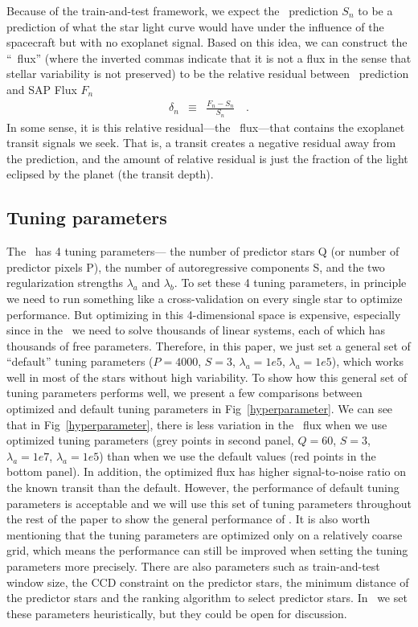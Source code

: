 Because of the train-and-test framework,  we expect the \name\ prediction $S_{n}$ to be a prediction of what the star light curve would have under the influence of the spacecraft but with no exoplanet signal. 
Based on this idea, 
  we can construct the ``\name\ flux'' 
  (where the inverted commas indicate that it is not a flux in the sense that stellar variability is not preserved) 
  to be the relative residual between \name\ prediction and SAP Flux $F_{n}$
\begin{eqnarray}
\delta_{n}&\equiv&\frac{F_{n} - S_{n}}{S_{n}}
\quad .
\end{eqnarray} 
In some sense, it is this relative residual---the \name\ flux---that contains the exoplanet transit signals we seek. 
That is, a transit creates a negative residual away from the prediction, 
  and the amount of relative residual is just the fraction of the light eclipsed by the planet (the transit depth). 

\subsection{Tuning parameters}
The \name\ has 4 tuning parameters--- 
  the number of predictor stars Q (or number of predictor pixels P), 
  the number of autoregressive components S, 
  and the two regularization strengths $\lambda_{a}$ and $\lambda_{b}$.
To set these 4 tuning parameters, 
  in principle we need to run something like a cross-validation on every single star to optimize performance.
But optimizing in this 4-dimensional space is expensive, 
  especially since in the \name\ we need to solve thousands of linear systems, 
  each of which has thousands of free parameters. 
Therefore, in this paper, 
  we just set a general set of ``default'' tuning parameters ($P=4000$, $S=3$, $\lambda_a=1e5$, $\lambda_a=1e5$), 
  which works well in most of the stars without high variability. 
To show how this general set of tuning parameters performs well, we present a few comparisons between optimized and default tuning parameters in Fig~\ref{hyperparameter}.
We can see that in Fig~\ref{hyperparameter}, 
  there is less variation in the \name\ flux 
  when we use optimized tuning parameters (grey points in second panel, $Q=60$, $S=3$, $\lambda_a=1e7$, $\lambda_a=1e5$) 
  than when we use the default values (red points in the bottom panel). 
In addition, the optimized flux has higher signal-to-noise ratio on the known transit than the default. 
However, the performance of default tuning parameters is acceptable 
  and we will use this set of tuning parameters throughout the rest of the paper 
  to show the general performance of \name. 
It is also worth mentioning that the tuning parameters are optimized only on a relatively coarse grid, which means the performance can still be improved when setting the tuning parameters more precisely.
There are also parameters such as train-and-test window size, the CCD constraint on the predictor stars, the minimum distance of the predictor stars and the ranking algorithm to select predictor stars. In \name\ we set these parameters heuristically, but they could be open for discussion.
  
